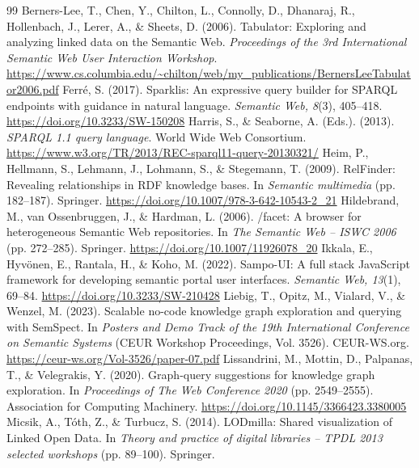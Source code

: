 \documentclass[11pt,a4paper]{article}
\begin{document}
\begin{thebibliography}{99}
\setlength{\itemsep}{5pt}
Berners-Lee, T., Chen, Y., Chilton, L., Connolly, D., Dhanaraj, R., Hollenbach, J., Lerer, A., \& Sheets, D. (2006).
Tabulator: Exploring and analyzing linked data on the Semantic Web.
\emph{Proceedings of the 3rd International Semantic Web User Interaction Workshop}.
\url{https://www.cs.columbia.edu/~chilton/web/my_publications/BernersLeeTabulator2006.pdf}
Ferr\'e, S. (2017). Sparklis: An expressive query builder for SPARQL endpoints with guidance in natural language.
\emph{Semantic Web, 8}(3), 405--418. \url{https://doi.org/10.3233/SW-150208}
Harris, S., \& Seaborne, A. (Eds.). (2013). \emph{SPARQL 1.1 query language}. World Wide Web Consortium.
\url{https://www.w3.org/TR/2013/REC-sparql11-query-20130321/}
Heim, P., Hellmann, S., Lehmann, J., Lohmann, S., \& Stegemann, T. (2009).
RelFinder: Revealing relationships in RDF knowledge bases. In \emph{Semantic multimedia} (pp. 182--187). Springer.
\url{https://doi.org/10.1007/978-3-642-10543-2_21}
Hildebrand, M., van Ossenbruggen, J., \& Hardman, L. (2006).
/facet: A browser for heterogeneous Semantic Web repositories. In \emph{The Semantic Web -- ISWC 2006} (pp. 272--285). Springer.
\url{https://doi.org/10.1007/11926078_20}
Ikkala, E., Hyv\"onen, E., Rantala, H., \& Koho, M. (2022).
Sampo-UI: A full stack JavaScript framework for developing semantic portal user interfaces.
\emph{Semantic Web, 13}(1), 69--84. \url{https://doi.org/10.3233/SW-210428}
Liebig, T., Opitz, M., Vialard, V., \& Wenzel, M. (2023).
Scalable no-code knowledge graph exploration and querying with SemSpect.
In \emph{Posters and Demo Track of the 19th International Conference on Semantic Systems} (CEUR Workshop Proceedings, Vol. 3526). CEUR-WS.org.
\url{https://ceur-ws.org/Vol-3526/paper-07.pdf}
Lissandrini, M., Mottin, D., Palpanas, T., \& Velegrakis, Y. (2020).
Graph-query suggestions for knowledge graph exploration.
In \emph{Proceedings of The Web Conference 2020} (pp. 2549--2555). Association for Computing Machinery.
\url{https://doi.org/10.1145/3366423.3380005}
Micsik, A., T\'oth, Z., \& Turbucz, S. (2014).
LODmilla: Shared visualization of Linked Open Data.
In \emph{Theory and practice of digital libraries -- TPDL 2013 selected workshops} (pp. 89--100). Springer.

\end{thebibliography}
\end{document}
